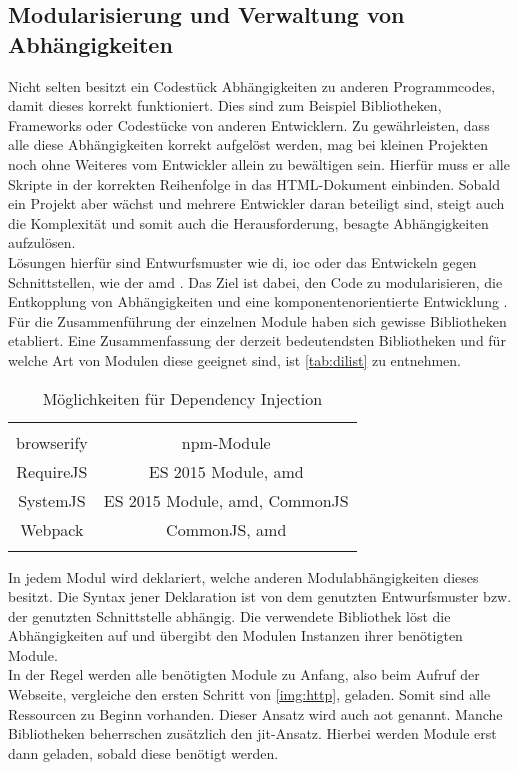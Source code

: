 \subsection{Modularisierung und Verwaltung von Abhängigkeiten}
Nicht selten besitzt ein Codestück Abhängigkeiten zu anderen Programmcodes, damit dieses korrekt funktioniert. Dies sind zum Beispiel Bibliotheken, Frameworks oder Codestücke von anderen Entwicklern. Zu gewährleisten, dass alle diese Abhängigkeiten korrekt aufgelöst werden, mag bei kleinen Projekten noch ohne Weiteres vom Entwickler allein zu bewältigen sein. Hierfür muss er alle Skripte in der korrekten Reihenfolge in das HTML-Dokument einbinden. Sobald ein Projekt aber wächst und mehrere Entwickler daran beteiligt sind, steigt auch die Komplexität und somit auch die Herausforderung, besagte Abhängigkeiten aufzulösen. \\
Lösungen hierfür sind Entwurfsmuster wie \ac{di}, \ac{ioc} \cite[S. 25 ff.]{GollDausmann2013} oder das Entwickeln gegen Schnittstellen, wie der \ac{amd} \cite[S. 266 ff.]{ste15}. Das Ziel ist dabei, den Code zu modularisieren, die Entkopplung von Abhängigkeiten und eine komponentenorientierte Entwicklung \cite[S. 261]{ste15}. Für die Zusammenführung der einzelnen Module haben sich gewisse Bibliotheken etabliert. Eine Zusammenfassung der derzeit bedeutendsten Bibliotheken und für welche Art von Modulen diese geeignet sind, ist \autoref{tab:dilist} zu entnehmen.

\begin{minipage}{\textwidth}
\begin{longtable}{|c|c|}
	\hline  
	\thead{Bibliothek} & \thead{Geeignet für}\\  \hhline{|=|=|}
	browserify &  npm-Module \\
	\hline
	RequireJS & ES 2015 Module, \ac{amd}   \\ 
	\hline 
	SystemJS &  ES 2015 Module, \ac{amd}, CommonJS  \\ 
	\hline 
	Webpack & CommonJS, \ac{amd}   \\ 
	\hline 
	
	\caption{Möglichkeiten für Dependency Injection}\label{tab:dilist}
\end{longtable}
\end{minipage}


In jedem Modul wird deklariert, welche anderen Modulabhängigkeiten dieses besitzt. Die Syntax jener Deklaration ist von dem genutzten Entwurfsmuster bzw. der genutzten Schnittstelle abhängig. Die verwendete Bibliothek löst die Abhängigkeiten auf und übergibt den Modulen Instanzen ihrer benötigten Module. \\
In der Regel werden alle benötigten Module zu Anfang, also beim Aufruf der Webseite, vergleiche den ersten Schritt von \autoref{img:http}, geladen. Somit sind alle Ressourcen zu Beginn vorhanden. Dieser Ansatz wird auch \ac{aot} genannt. Manche Bibliotheken beherrschen zusätzlich den \ac{jit}-Ansatz. Hierbei werden Module erst dann geladen, sobald diese benötigt werden.
